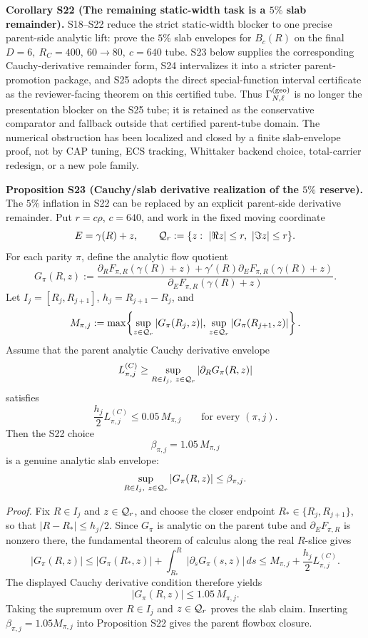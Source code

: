 \documentclass[aps,prd,onecolumn,notitlepage,nofootinbib,superscriptaddress,11pt,floatfix]{revtex4-2}
\begin{document}
\medskip\noindent\textbf{Corollary S22 (The remaining static-width task is a \(5\%\) slab remainder).}
S18--S22 reduce the strict static-width blocker to one precise parent-side
analytic lift: prove the \(5\%\) slab envelopes for \(B_c(R)\) on the final
\(D=6,\ R_C=400,\ 60\to80,\ c=640\) tube.  S23 below supplies the corresponding
Cauchy-derivative remainder form, S24 intervalizes it into a stricter
parent-promotion package, and S25 adopts the direct special-function interval
certificate as the reviewer-facing theorem on this certified tube.  Thus
\(\Gamma_{N,\ell}^{\rm(geo)}\) is no longer the presentation blocker on the
S25 tube; it is retained as the conservative comparator and fallback outside
that certified parent-tube domain.  The numerical obstruction has been
localized and closed by a finite slab-envelope proof, not by CAP tuning, ECS
tracking, Whittaker backend choice, total-carrier redesign, or a new pole
family.

\medskip\noindent\textbf{Proposition S23 (Cauchy/slab derivative realization of the \(5\%\) reserve).}
The \(5\%\) inflation in S22 can be replaced by an explicit parent-side
derivative remainder.  Put \(r=c\rho\), \(c=640\), and work in the fixed moving
coordinate
\[
E=\gamma(R)+z,\qquad
{\cal Q}_r:=\{z:\ |\Re z|\le r,\ |\Im z|\le r\}.
\]
For each parity \(\pi\), define the analytic flow quotient
\[
G_\pi(R,z):=
\frac{\partial_RF_{\pi,R}(\gamma(R)+z)
      +\gamma'(R)\partial_EF_{\pi,R}(\gamma(R)+z)}
     {\partial_EF_{\pi,R}(\gamma(R)+z)} .
\]
Let \(I_j=[R_j,R_{j+1}]\), \(h_j=R_{j+1}-R_j\), and
\[
M_{\pi,j}:=
\max\!\left\{
\sup_{z\in{\cal Q}_r}|G_\pi(R_j,z)|,\,
\sup_{z\in{\cal Q}_r}|G_\pi(R_{j+1},z)|
\right\}.
\]
Assume that the parent analytic Cauchy derivative envelope
\[
L^{(C)}_{\pi,j}\ge
\sup_{R\in I_j,\ z\in{\cal Q}_r}
\left|\partial_R G_\pi(R,z)\right|
\]
satisfies
\[
\frac{h_j}{2}L^{(C)}_{\pi,j}\le 0.05\,M_{\pi,j}
\qquad\text{for every }(\pi,j).
\]
Then the S22 choice
\[
\beta_{\pi,j}=1.05\,M_{\pi,j}
\]
is a genuine analytic slab envelope:
\[
\sup_{R\in I_j,\ z\in{\cal Q}_r}|G_\pi(R,z)|
\le \beta_{\pi,j}.
\]

\emph{Proof.}
Fix \(R\in I_j\) and \(z\in{\cal Q}_r\), and choose the closer endpoint
\(R_\ast\in\{R_j,R_{j+1}\}\), so that \(|R-R_\ast|\le h_j/2\).  Since
\(G_\pi\) is analytic on the parent tube and \(\partial_EF_{\pi,R}\) is
nonzero there, the fundamental theorem of calculus along the real \(R\)-slice
gives
\[
|G_\pi(R,z)|
\le |G_\pi(R_\ast,z)|
   +\int_{R_\ast}^{R}|\partial_sG_\pi(s,z)|\,ds
\le M_{\pi,j}+\frac{h_j}{2}L^{(C)}_{\pi,j}.
\]
The displayed Cauchy derivative condition therefore yields
\[
|G_\pi(R,z)|\le 1.05\,M_{\pi,j}.
\]
Taking the supremum over \(R\in I_j\) and \(z\in{\cal Q}_r\) proves the slab
claim.  Inserting \(\beta_{\pi,j}=1.05M_{\pi,j}\) into Proposition S22 gives
the parent flowbox closure.
\end{document}
